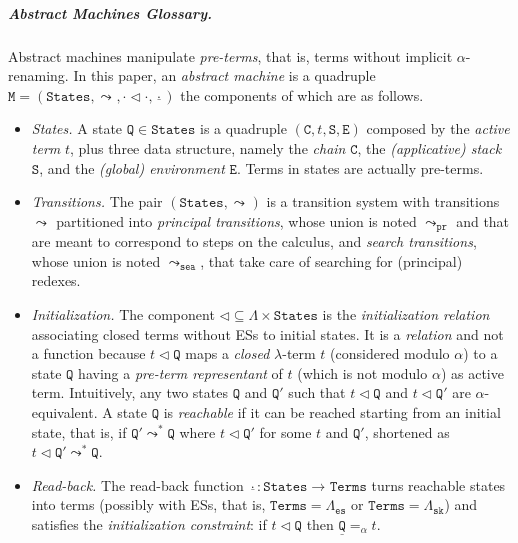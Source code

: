 \documentclass[10pt,a4paper]{article}
\theoremstyle{remark}
\newcommand{\tm}{t}
\newcommand{\Rew}[1]{\rightarrow_{#1}}
\renewcommand{\to}{\Rew{}}
\newcommand{\symfont}[1]{\mathtt{#1}}
\renewcommand{\l}{\lambda}
\newcommand{\env}{\genv}
\newcommand{\genv}{\symfont{E}}
\newcommand{\stack}{\symfont{S}}
\newcommand{\States}{\symfont{States}}
\renewcommand{\state}{\symfont{Q}}
\newcommand{\state}{\symfont{Q}}
\newcommand{\statetwo}{\state'}
\newcommand{\decode}[1]{\underline{#1}}
\newcommand{\mach}{\symfont{M}}
\newcommand{\tomachhole}[1]{\leadsto_{#1}}
\newcommand{\tomach}{\tomachhole{}}
\newcommand{\seasym}{\symfont{sea}}
\newcommand{\tomachsea}{\tomachhole{\seasym}}
\renewcommand{\terms}{\Lambda}
\newcommand{\terms}{\Lambda}
\newcommand{\absterms}{\symfont{Terms}}
\newcommand{\esterms}{\Lambda_{\symfont{es}}}
\newcommand{\skterms}{\Lambda_{\symfont{sk}}}
\newcommand{\chain}{\symfont{C}}
\newcommand{\prsym}{\symfont{pr}}
\newcommand{\tomachpr}{\tomachhole{\prsym}}
\newcommand{\fourstate}[4]{(#1,#2,#3,#4)}
\newcommand{\compilrelsym}{\triangleleft}
\newcommand{\compilrel}[2]{#1\compilrelsym#2}
\begin{document}
\subparagraph{Abstract Machines Glossary.}  Abstract machines manipulate \emph{pre-terms}, that is, terms without implicit $\alpha$-renaming. In this paper, an \emph{abstract 
machine} is a quadruple $\mach = (\States, \tomach, \compilrel\cdot\cdot, \decode\cdot)$ the components of which are as follows.
\begin{itemize}

\item \emph{States.} A state $\state\in\States$ is a quadruple $\fourstate\chain\tm\stack\env$ composed by the \emph{active term} $\tm$, plus three data structure, namely the \emph{chain} $\chain$, the \emph{(applicative) stack} $\stack$, and the \emph{(global) environment} $\env$. Terms in states are actually pre-terms.

\item  \emph{Transitions.} The pair $(\States, \tomach)$ is a transition 
system with transitions $\tomach$ partitioned into \emph{principal transitions}, whose union is noted $\tomachpr$ and that are meant to correspond to steps on the calculus, and \emph{search transitions}, whose union is noted $\tomachsea$, that take care of searching for (principal) redexes.

\item \emph{Initialization.} The component $\compilrel{}{}\subseteq\terms\times\States$ is the \emph{initialization relation} associating closed terms without ESs to 
initial states. It is a \emph{relation} and not a function because $\compilrel\tm\state$ maps a \emph{closed} $\l$-term $\tm$ (considered modulo $\alpha$) to a state $\state$ having a \emph{pre-term representant} of $\tm$ (which is not modulo $\alpha$) as active term. Intuitively, any two states $\state$ and $\statetwo$ such that $\compilrel\tm\state$ and $\compilrel\tm\statetwo$ are $\alpha$-equivalent. 
A state $\state$ is \emph{reachable} if it can be reached starting from an initial state, that is, if $\statetwo \tomach^*\state$ where $\compilrel\tm\statetwo$ for some $\tm$ and $\statetwo$, shortened as $\compilrel\tm\statetwo \tomach^*\state$.

\item \emph{Read-back.} The read-back function $\decode\cdot:\States\to\absterms$ turns reachable states into 
terms (possibly with ESs, that is, $\absterms = \esterms$ or $\absterms = \skterms$) and satisfies the \emph{initialization constraint}: if $\compilrel\tm\state$ then $\decode{\state}=_\alpha\tm$.
\end{itemize}
\end{document}
